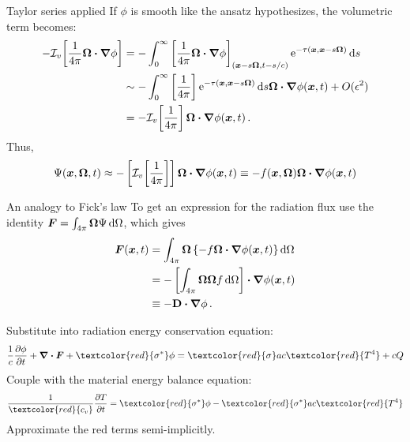 \documentclass{beamer}
\begin{document}
\begin{frame}{Taylor series applied}
  If $\phi$ is smooth like the ansatz hypothesizes, the volumetric term becomes:
  \begin{align} \nonumber
  -\mathcal{I}_{v}\!\left[ \frac{1}{4\pi} \bm{\Omega}\bm{\cdot} \bm{\nabla} \phi \right]
  &= -\int_{0}^{\infty}
    \left[ \frac{1}{4\pi} \bm{\Omega}\bm{\cdot} \bm{\nabla} \phi \right]_{(\bm{x} - s
    \bm{\Omega}, t-s/c)}
    \mathop{}\!\mathrm{e}^{ -\tau(\bm{x}, \bm{x} - s \bm{\Omega})}
    \mathop{}\!\mathrm{d} s
  \\\nonumber
  &\sim - \int_{0}^{\infty}
    \left[ \frac1{4\pi}\right]
    \mathop{}\!\mathrm{e}^{ -\tau(\bm{x}, \bm{x} - s \bm{\Omega})} \mathop{}\!\mathrm{d} s
    \bm{\Omega}\bm{\cdot} \bm{\nabla} \phi(\bm{x},t) + O(\epsilon^2)
  \\\label{eq:tildeS}
  &= - \mathcal{I}_{v}\!\left[ \frac1{4\pi} \right] \bm{\Omega}\bm{\cdot} \bm{\nabla} \phi(\bm{x},t)\,.
  \end{align}
  Thus,
  \begin{equation}\label{eq:capPsiApprox}
    \Psi(\bm{x}, \bm{\Omega}, t) \approx
    - \left[ \mathcal{I}_{v}\!\left[ \frac1{4\pi} \right] \right]
    \bm{\Omega}\bm{\cdot} \bm{\nabla} \phi(\bm{x},t)
    \equiv -f(\bm{x}, \bm{\Omega}) \bm{\Omega}\bm{\cdot} \bm{\nabla} \phi(\bm{x},t)
  \end{equation}
\end{frame}

\begin{frame}{An analogy to Fick's law}
  To get an expression for the radiation flux use the
  identity
  $\bm{F} = \int_{4\pi}\bm{\Omega} \Psi \mathop{}\!\mathrm{d}\Omega$, which gives
  \begin{align*}
    \bm{F}(\bm{x}, t)
    &= \int_{4\pi}\bm{\Omega} \left\{
    -f \bm{\Omega}\bm{\cdot} \bm{\nabla} \phi(\bm{x},t) \right\} \mathop{}\!\mathrm{d}\Omega
    \\
    &= - \left[ \int_{4\pi}\bm{\Omega} \bm{\Omega} f \mathop{}\!\mathrm{d}\Omega\right]
    \bm{\cdot} \bm{\nabla} \phi(\bm{x},t) 
    \\
      &\equiv -\mathbf{D} \bm{\cdot} \bm{\nabla} \phi \,.
  \end{align*}

  Substitute into radiation energy conservation equation:
\begin{equation*}
  \frac{1}{c} \pder{\phi}{t}
  + \del \vd \vec{F} + \textcolor{red}{\sigma^*} \phi
  = \textcolor{red}{\sigma} ac\textcolor{red}{T^4}
  + c Q
\end{equation*}
Couple with the material energy balance equation:
\begin{equation*}
  \frac{1}{\textcolor{red}{c_v}}\pder{T}{t} = \textcolor{red}{\sigma^*} \phi -
  \textcolor{red}{\sigma^*} ac\textcolor{red}{T^4}
\end{equation*}
Approximate the red terms semi-implicitly.
\end{frame}
\end{document}

